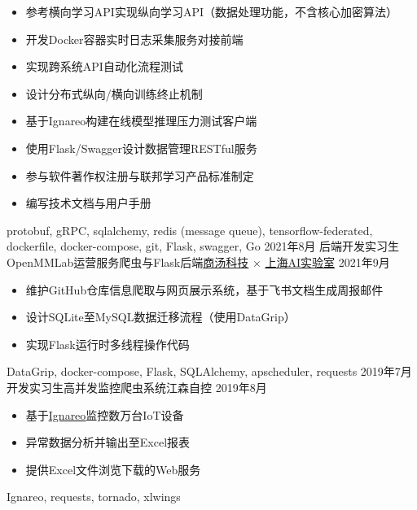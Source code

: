 \begin{experiences}
{\begin{itemize}
                        \item 参考横向学习API实现纵向学习API（数据处理功能，不含核心加密算法）
                        \item 开发Docker容器实时日志采集服务对接前端
                        \item 实现跨系统API自动化流程测试
                        \item 设计分布式纵向/横向训练终止机制
                        \item 基于Ignareo构建在线模型推理压力测试客户端
                        \item 使用Flask/Swagger设计数据管理RESTful服务
                        \item 参与软件著作权注册与联邦学习产品标准制定
                        \item 编写技术文档与用户手册
                      \end{itemize}
                    }
                    {protobuf, gRPC, sqlalchemy, redis (message queue), tensorflow-federated, dockerfile, docker-compose, git, Flask, swagger, Go}
  \emptySeparator
  \experience
    {2021年8月}     {后端开发实习生}{OpenMMLab运营服务爬虫与Flask后端}{\href{https://www.sensetime.com/}{\underline{商汤科技}} × \href{https://www.shlab.org.cn/}{\underline{上海AI实验室}}}
    {2021年9月}    {
                      \begin{itemize}
                        \item 维护GitHub仓库信息爬取与网页展示系统，基于飞书文档生成周报邮件
                        \item 设计SQLite至MySQL数据迁移流程（使用DataGrip）
                        \item 实现Flask运行时多线程操作代码
                      \end{itemize}
                    }
                    {DataGrip, docker-compose, Flask, SQLAlchemy, apscheduler, requests}
  \emptySeparator
  \experience
    {2019年7月}     {开发实习生}{高并发监控爬虫系统}{江森自控}
    {2019年8月}    {
                      \begin{itemize}
                        \item 基于\href{https://github.com/Hecate2/Ignareo-ISML-auto-voter}{\underline{Ignareo}}监控数万台IoT设备
                        \item 异常数据分析并输出至Excel报表
                        \item 提供Excel文件浏览下载的Web服务
                      \end{itemize}
                    }
                    {Ignareo, requests, tornado, xlwings}
  \emptySeparator

\end{experiences}
